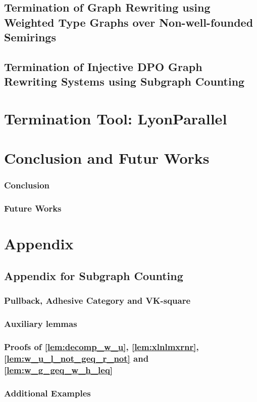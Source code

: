 \documentclass{book}
\begin{document}
\chapter{Termination of Graph Rewriting using Weighted Type Graphs over Non-well-founded Semirings}
\label{part:morphisms_from_gls_to_grs}

  
\chapter{Termination of Injective DPO Graph Rewriting Systems using Subgraph Counting}
 \label{part:terminating_injective_dpo_grs}
 
 

\part{Termination Tool: LyonParallel}

\part{Conclusion and Futur Works}
\section{Conclusion}

\section{Future Works}


\part{Appendix}
\chapter{Appendix for Subgraph Counting}
\section*{Pullback, Adhesive Category and VK-square}

\section*{Auxiliary lemmas}

\section*{Proofs of \autoref{lem:decomp_w_u}, \autoref{lem:xlnlmxrnr}, \autoref{lem:w_u_l_not_geq_r_not} and \autoref{lem:w_g_geq_w_h_leq}}
\label{sec:appendix:a}

\section*{Additional Examples}



\printbibliography
\end{document}
